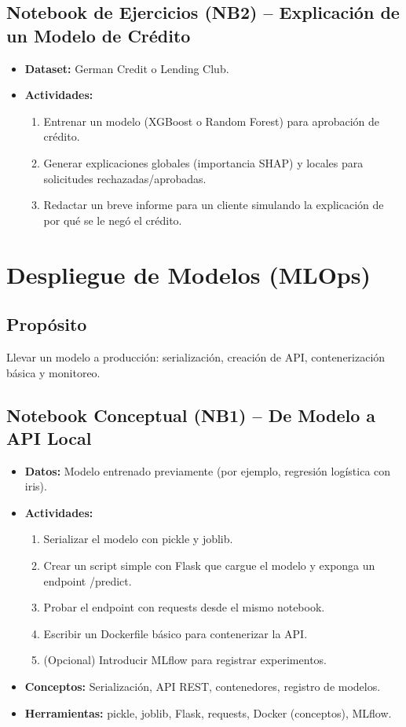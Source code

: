 \documentclass[12pt,a4paper]{article}
\begin{document}
\subsection*{Notebook de Ejercicios (NB2) – Explicación de un Modelo de Crédito}
\begin{itemize}
    \item \textbf{Dataset:} German Credit o Lending Club.
    \item \textbf{Actividades:}
    \begin{enumerate}
        \item Entrenar un modelo (XGBoost o Random Forest) para aprobación de crédito.
        \item Generar explicaciones globales (importancia SHAP) y locales para solicitudes rechazadas/aprobadas.
        \item Redactar un breve informe para un cliente simulando la explicación de por qué se le negó el crédito.
    \end{enumerate}
\end{itemize}

\section{Despliegue de Modelos (MLOps)}
\subsection*{Propósito}
Llevar un modelo a producción: serialización, creación de API, contenerización básica y monitoreo.

\subsection*{Notebook Conceptual (NB1) – De Modelo a API Local}
\begin{itemize}
    \item \textbf{Datos:} Modelo entrenado previamente (por ejemplo, regresión logística con iris).
    \item \textbf{Actividades:}
    \begin{enumerate}
        \item Serializar el modelo con pickle y joblib.
        \item Crear un script simple con Flask que cargue el modelo y exponga un endpoint /predict.
        \item Probar el endpoint con requests desde el mismo notebook.
        \item Escribir un Dockerfile básico para contenerizar la API.
        \item (Opcional) Introducir MLflow para registrar experimentos.
    \end{enumerate}
    \item \textbf{Conceptos:} Serialización, API REST, contenedores, registro de modelos.
    \item \textbf{Herramientas:} pickle, joblib, Flask, requests, Docker (conceptos), MLflow.
\end{itemize}
\end{document}
